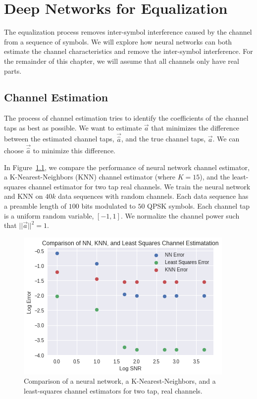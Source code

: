 \chapter[Deep Networks for Equalization]{Deep Networks for Equalization\raisebox{.3\baselineskip}{\normalsize\footnotemark}}

The equalization process removes inter-symbol interference caused by the channel from a sequence of symbols.  We will explore how neural networks can both estimate the channel characteristics and remove the inter-symbol interference.  For the remainder of this chapter, we will assume that all channels only have real parts. 

\section{Channel Estimation}

The process of channel estimation tries to identify the coefficients of the channel taps as best as possible.  We want to estimate $\vec{a}$ that minimizes the difference between the estimated channel taps, $\vec{\hat{a}}$, and the true channel taps, $\vec{a}$.  We can choose $\vec{\hat{a}}$ to minimize this difference.

In Figure~\ref{fig:chann_est}, we compare the performance of neural network channel estimator, a K-Nearest-Neighbors (KNN) channel estimator (where $K=15$), and the least-squares channel estimator for two tap real channels.
We train the neural network and KNN on $40k$ data sequences with random channels.  Each data sequence has a preamble length of $100$ bits modulated to $50$ QPSK symbols.  
Each channel tap is a uniform random variable, $[-1,1]$.  We normalize the channel power such that $||\vec{a}||^2 = 1$.  

\begin{figure}
\begin{center}
\includegraphics{figures/equal/Channel_Estimation_KNN_LSTSQ_NN.png}
\caption{Comparison of a neural network, a K-Nearest-Neighbors, and a least-squares channel estimators for two tap, real channels.}
\label{fig:chann_est}
\end{center}
\end{figure}

